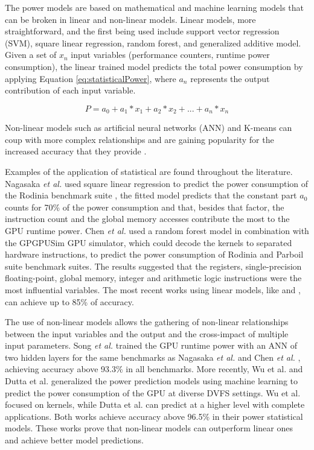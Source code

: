 The power models are based on mathematical and machine learning models that can be broken in linear and non-linear models. Linear models, more straightforward, and the first being used include support vector regression (SVM), square linear regression, random forest, and generalized additive model.
Given a set of $x_n$ input variables (performance counters, runtime power consumption), the linear trained model predicts the total power consumption by applying Equation \ref{eq:statisticalPower}, where $a_n$ represents the output contribution of each input variable.

\begin{equation}
\label{eq:statisticalPower}
    P = a_0 + a_1 * x_1 + a_2 * x_2 + ... + a_n * x_n
\end{equation}

Non-linear models such as artificial neural networks (ANN) and K-means can coup with more complex relationships and are gaining popularity for the increased accuracy that they provide \cite{mei_survey_2016}. 

Examples of the application of statistical are found throughout the literature. Nagasaka \textit{et al.} \cite{nagasaka_statistical_2010} used square linear regression to predict the power consumption of the Rodinia benchmark suite \cite{che_rodinia:_2009}, the fitted model predicts that the constant part $a_0$ counts for 70\% of the power consumption and that, besides that factor, the instruction count and the global memory accesses contribute the most to the GPU runtime power.  Chen \textit{et al.} \cite{chen_statistical_2011} used a random forest model in combination with the GPGPUSim GPU simulator, which could decode the kernels to separated hardware instructions, to predict the power consumption of Rodinia \cite{che_rodinia:_2009} and Parboil suite \cite{stratton_parboil:_nodate} benchmark suites. The results suggested that the registers, single-precision floating-point, global memory, integer and arithmetic logic instructions were the most influential variables. The most recent works using linear models, like \cite{abe_power_2014} and \cite{ghosh_statistical_2013}, can achieve up to 85\% of accuracy.

The use of non-linear models allows the gathering of non-linear relationships between the input variables and the output and the cross-impact of multiple input parameters. Song \textit{et al.} \cite{song_simplified_2013} trained the GPU runtime power with an ANN of two hidden layers for the same benchmarks as Nagasaka \textit{et al.} \cite{nagasaka_statistical_2010} and Chen \textit{et al.} \cite{chen_statistical_2011}, achieving accuracy above 93.3\% in all benchmarks. More recently, Wu et al. \cite{wu_gpgpu_2015} and Dutta et al. \cite{dutta_gpu_2018} generalized the power prediction models using machine learning to predict the power consumption of the GPU at diverse DVFS settings. Wu et al. focused on kernels, while Dutta et al. can predict at a higher level with complete applications. Both works achieve accuracy above 96.5\% in their power statistical models. These works prove that non-linear models can outperform linear ones and achieve better model predictions.

